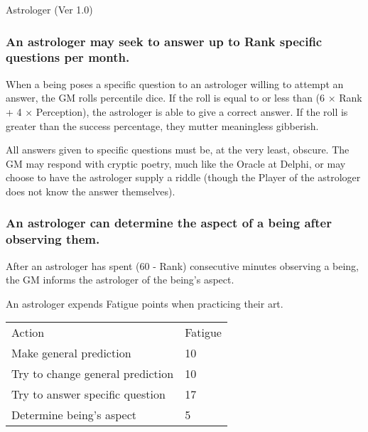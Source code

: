 \begin{Chapter}{Astrologer (Ver 1.0)}
\subsubsection{An astrologer may seek to answer up to Rank specific questions per
month.}

When a being poses a specific question to an astrologer willing to
attempt an answer, the GM rolls percentile dice. If the roll is equal
to or less than (6 × Rank + 4 × Perception), the astrologer is able to
give a correct answer. If the roll is greater than the success
percentage, they mutter meaningless gibberish.

All answers given to specific questions must be, at the very least,
obscure. The GM may respond with cryptic poetry, much like the Oracle
at Delphi, or may choose to have the astrologer supply a riddle
(though the Player of the astrologer does not know the answer
themselves).

\subsubsection{An astrologer can determine the aspect of a being after observing
them.}

After an astrologer has spent (60 - Rank) consecutive minutes
observing a being, the GM informs the astrologer of the being’s
aspect.

An astrologer expends Fatigue points when practicing their art.

\begin{tabularx}{\columnwidth}{ll}
Action					& Fatigue \\
Make general prediction			& 10 \\ 
Try to change general prediction	& 10 \\
Try to answer specific question		& 17 \\
Determine being’s aspect		& 5 \\
\end{tabularx}

\end{Chapter}
